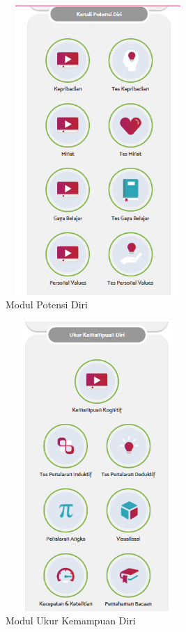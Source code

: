 \begin{enumerate}
    \begin{figure}[H]
        \centering
        \includegraphics[width = 7cm, height = 11cm ]{doc/DokumenSkripsi/Gambar/gambar34.PNG}
        \caption{Modul Potensi Diri}
        \label{gambar34}
    \end{figure}
    
    \begin{figure}[H]
        \centering
        \includegraphics[width = 7cm, height = 11cm ]{doc/DokumenSkripsi/Gambar/gambar35.PNG}
        \caption{Modul Ukur Kemampuan Diri}
        \label{gambar35}
    \end{figure}
    

\end{enumerate}
